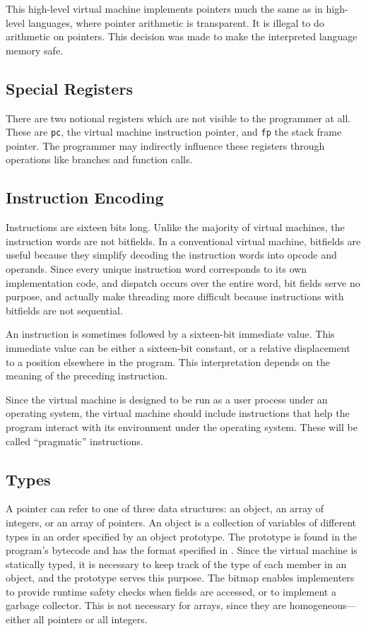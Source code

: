		This high-level virtual machine implements pointers much the same as in high-level languages, where pointer arithmetic is transparent. It is illegal to do arithmetic on pointers. This decision was made to make the interpreted language memory safe.
		
		\subsection{Special Registers}
		There are two notional registers which are not visible to the programmer at all. These are \texttt{pc}, the virtual machine instruction pointer, and \texttt{fp} the stack frame pointer. The programmer may indirectly influence these registers through operations like branches and function calls.
		
		\subsection{Instruction Encoding}
		Instructions are sixteen bits long. Unlike the majority of virtual machines, the instruction words are not bitfields. In a conventional virtual machine, bitfields are useful because they simplify decoding the instruction words into opcode and operands. Since every unique instruction word corresponds to its own implementation code, and dispatch occurs over the entire word, bit fields serve no purpose, and actually make  threading more difficult because instructions with bitfields are not sequential.
		
		An instruction is sometimes followed by a sixteen-bit immediate value. This immediate value can be either a sixteen-bit constant, or a relative displacement to a position elsewhere in the program. This interpretation depends on the meaning of the preceding instruction.
		
		Since the virtual machine is designed to be run as a user process under an operating system, the virtual machine should include instructions that help the program interact with its environment under the operating system. These will be called ``pragmatic'' instructions.
		
		\subsection{Types}
		A pointer can refer to one of three data structures: an object, an array of integers, or an array of pointers. An object is a collection of variables of different types in an order specified by an object prototype. The prototype is found in the program's bytecode and has the format specified in . Since the virtual machine is statically typed, it is necessary to keep track of the type of each member in an object, and the prototype serves this purpose. The bitmap enables implementers to provide runtime safety checks when fields are accessed, or to implement a garbage collector. This is not necessary for arrays, since they are homogeneous---either all pointers or all integers.
		
